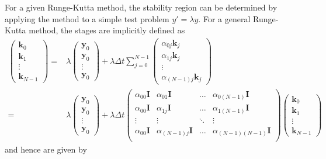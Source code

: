 \documentclass[10pt,a4paper]{article}
\newcommand{\bvec}[1]{\mathbf{#1}}
\begin{document}
For a given Runge-Kutta method, the stability region can be determined by applying the method to a
simple test problem $y' = \lambda y.$
For a general Runge-Kutta method, the stages are implicitly defined as
\begin{align*}
  \begin{pmatrix} \bvec{k}_0 \\
    \bvec{k}_1 \\
    \vdots \\
    \bvec{k}_{N-1}
  \end{pmatrix}
  =& \lambda \begin{pmatrix} \bvec{y}_0 \\
    \bvec{y}_0 \\
    \vdots \\
    \bvec{y}_0
  \end{pmatrix}
  + \lambda \Delta t \sum_{j=0}^{N-1} \begin{pmatrix}
    \alpha_{0j}\bvec{k}_j \\
    \alpha_{1j}\bvec{k}_j \\
    \vdots \\
    \alpha_{(N-1)j}\bvec{k}_j
  \end{pmatrix} \\
  =& \lambda \begin{pmatrix} \bvec{y}_0 \\
    \bvec{y}_0 \\
    \vdots \\
    \bvec{y}_0
  \end{pmatrix} + \lambda \Delta t \begin{pmatrix}
    \alpha_{00}\bvec{I} &\alpha_{01}\bvec{I} &\hdots &\alpha_{0(N-1)}\bvec{I} \\
    \alpha_{00}\bvec{I} &\alpha_{1j}\bvec{I} &\hdots &\alpha_{1(N-1)}\bvec{I} \\
    \vdots & \vdots & \ddots & \vdots \\
    \alpha_{00}\bvec{I} &\alpha_{(N-1)j}\bvec{I} &\hdots &\alpha_{(N-1)(N-1)}\bvec{I} \\
  \end{pmatrix} \begin{pmatrix}
    \bvec{k}_0 \\
    \bvec{k}_1 \\
    \vdots \\
    \bvec{k}_{N-1}
  \end{pmatrix}
\end{align*}
and hence are given by
\end{document}
